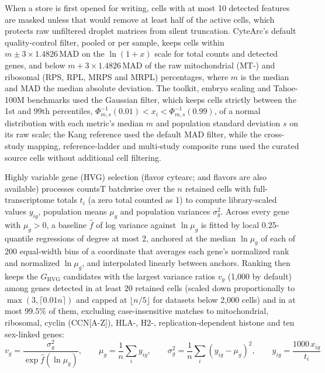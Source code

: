 \documentclass[11pt]{article}
\begin{document}
When a store is first opened for writing, cells with at most 10 detected features are masked unless that would remove at least half of the active cells, which protects raw unfiltered droplet matrices from silent truncation. CyteArc's default quality-control filter, pooled or per sample, keeps cells within $m\pm3\times1.4826\,\mathrm{MAD}$ on the $\ln(1+x)$ scale for total counts and detected genes, and below $m+3\times1.4826\,\mathrm{MAD}$ of the raw mitochondrial (MT-) and ribosomal (RPS, RPL, MRPS and MRPL) percentages, where $m$ is the median and MAD the median absolute deviation. The toolkit, embryo scaling and Tahoe-100M benchmarks used the Gaussian filter, which keeps cells strictly between the 1st and 99th percentiles, $\Phi^{-1}_{m,s}(0.01)<x_i<\Phi^{-1}_{m,s}(0.99)$, of a normal distribution with each metric's median $m$ and population standard deviation $s$ on its raw scale; the Kang reference used the default MAD filter, while the cross-study mapping, reference-ladder and multi-study composite runs used the curated source cells without additional cell filtering.

Highly variable gene (HVG) selection (flavor cytearc;  and  flavors are also available) processes countsT batchwise over the $n$ retained cells with full-transcriptome totals $t_i$ (a zero total counted as 1) to compute library-scaled values $y_{ig}$, population means $\mu_g$ and population variances $\sigma_g^{2}$. Across every gene with $\mu_g>0$, a baseline $\hat f$ of log variance against $\ln\mu_g$ is fitted by local 0.25-quantile regressions of degree at most 2, anchored at the median $\ln\mu_g$ of each of 200 equal-width bins of a coordinate that averages each gene's normalized rank and normalized $\ln\mu_g$, and interpolated linearly between anchors. Ranking then keeps the $G_{\mathrm{HVG}}$ candidates with the largest variance ratios $v_g$ (1,000 by default) among genes detected in at least 20 retained cells (scaled down proportionally to $\max(3,\lceil0.01n\rceil)$ and capped at $\lfloor n/5\rfloor$ for datasets below 2,000 cells) and in at most 99.5\% of them, excluding case-insensitive matches to mitochondrial, ribosomal, cyclin (CCN[A-Z]), HLA-, H2-, replication-dependent histone and ten sex-linked genes:
\[
v_g=\frac{\sigma_g^{2}}{\exp\hat f\left(\ln\mu_g\right)},\qquad \mu_g=\frac{1}{n}\sum_{i}y_{ig},\qquad \sigma_g^{2}=\frac{1}{n}\sum_{i}\left(y_{ig}-\mu_g\right)^{2},\qquad y_{ig}=\frac{1000\,x_{ig}}{t_i}
\]
\end{document}

